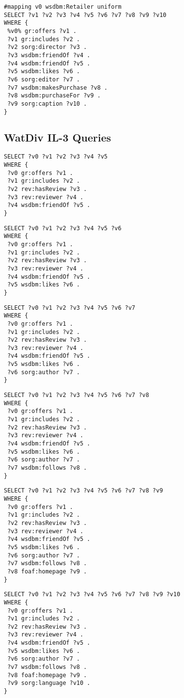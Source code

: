 \begin{lstlisting}[caption={IL-2-10},label=query:IL-2-10]
#mapping v0 wsdbm:Retailer uniform
SELECT ?v1 ?v2 ?v3 ?v4 ?v5 ?v6 ?v7 ?v8 ?v9 ?v10
WHERE {
 %v0% gr:offers ?v1 .
 ?v1 gr:includes ?v2 .
 ?v2 sorg:director ?v3 .
 ?v3 wsdbm:friendOf ?v4 .
 ?v4 wsdbm:friendOf ?v5 .
 ?v5 wsdbm:likes ?v6 .
 ?v6 sorg:editor ?v7 .
 ?v7 wsdbm:makesPurchase ?v8 .
 ?v8 wsdbm:purchaseFor ?v9 .
 ?v9 sorg:caption ?v10 .
}
\end{lstlisting}

\subsection{WatDiv IL-3 Queries} 

\begin{lstlisting}[caption={IL-3-5},label=query:IL-3-5]
SELECT ?v0 ?v1 ?v2 ?v3 ?v4 ?v5
WHERE {
 ?v0 gr:offers ?v1 .
 ?v1 gr:includes ?v2 .
 ?v2 rev:hasReview ?v3 .
 ?v3 rev:reviewer ?v4 .
 ?v4 wsdbm:friendOf ?v5 .
}
\end{lstlisting}

\begin{lstlisting}[caption={IL-3-7},label=query:IL-3-6]
SELECT ?v0 ?v1 ?v2 ?v3 ?v4 ?v5 ?v6
WHERE {
 ?v0 gr:offers ?v1 .
 ?v1 gr:includes ?v2 .
 ?v2 rev:hasReview ?v3 .
 ?v3 rev:reviewer ?v4 .
 ?v4 wsdbm:friendOf ?v5 .
 ?v5 wsdbm:likes ?v6 .
}
\end{lstlisting}

\begin{lstlisting}[caption={IL-3-7},label=query:IL-3-7]
SELECT ?v0 ?v1 ?v2 ?v3 ?v4 ?v5 ?v6 ?v7
WHERE {
 ?v0 gr:offers ?v1 .
 ?v1 gr:includes ?v2 .
 ?v2 rev:hasReview ?v3 .
 ?v3 rev:reviewer ?v4 .
 ?v4 wsdbm:friendOf ?v5 .
 ?v5 wsdbm:likes ?v6 .
 ?v6 sorg:author ?v7 .
}
\end{lstlisting}

\begin{lstlisting}[caption={IL-3-8},label=query:IL-3-8]
SELECT ?v0 ?v1 ?v2 ?v3 ?v4 ?v5 ?v6 ?v7 ?v8
WHERE {
 ?v0 gr:offers ?v1 .
 ?v1 gr:includes ?v2 .
 ?v2 rev:hasReview ?v3 .
 ?v3 rev:reviewer ?v4 .
 ?v4 wsdbm:friendOf ?v5 .
 ?v5 wsdbm:likes ?v6 .
 ?v6 sorg:author ?v7 .
 ?v7 wsdbm:follows ?v8 .
}
\end{lstlisting}

\begin{lstlisting}[caption={IL-3-9},label=query:IL-3-9]
SELECT ?v0 ?v1 ?v2 ?v3 ?v4 ?v5 ?v6 ?v7 ?v8 ?v9
WHERE {
 ?v0 gr:offers ?v1 .
 ?v1 gr:includes ?v2 .
 ?v2 rev:hasReview ?v3 .
 ?v3 rev:reviewer ?v4 .
 ?v4 wsdbm:friendOf ?v5 .
 ?v5 wsdbm:likes ?v6 .
 ?v6 sorg:author ?v7 .
 ?v7 wsdbm:follows ?v8 .
 ?v8 foaf:homepage ?v9 .
}
\end{lstlisting}

\begin{lstlisting}[caption={IL-3-10},label=query:IL-3-10]
SELECT ?v0 ?v1 ?v2 ?v3 ?v4 ?v5 ?v6 ?v7 ?v8 ?v9 ?v10
WHERE {
 ?v0 gr:offers ?v1 .
 ?v1 gr:includes ?v2 .
 ?v2 rev:hasReview ?v3 .
 ?v3 rev:reviewer ?v4 .
 ?v4 wsdbm:friendOf ?v5 .
 ?v5 wsdbm:likes ?v6 .
 ?v6 sorg:author ?v7 .
 ?v7 wsdbm:follows ?v8 .
 ?v8 foaf:homepage ?v9 .
 ?v9 sorg:language ?v10 .
}
\end{lstlisting}
